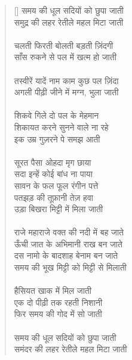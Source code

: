 \begin{verse}[\versewidth]\texthindi{
समय की धूल सदियों को छुपा जाती \\
समुद्र की लहर रेतीले महल मिटा जाती \\
\\
चलती फिरती बोलती बड़ती ज़िंदगी\\
साँस रुकने से पल में खत्म हो जाती\\
\\
तस्वीरें यादें नाम काम कुछ पल ज़िंदा\\
अगली पीढ़ी जीने में मग्न, भुला जाती \\
\\
शिकवे गिले दो पल के मेहमान\\
शिकायत करने सुनने वाले ना रहे \\
इक उम्र गुज़रने पे समझ आती\\
\\
सूरत पैसा ओहदा मृग छाया\\
सदा इन्हें कोई बांध ना पाया\\
सावन के फल फूल रंगीन पत्ते \\
पतझड़ की तूफ़ानी तेज़ हवा \\
उड़ा बिखरा मिट्टी में मिला जाती\\
\\
राजे महाराजे वक्त की नदी में बह जाते    \\
 ऊँची जात के अभिमानी राख बन जाते \\
दस नामो के बादशाह बेनाम बन जाते \\
समय की भूख मिट्टी को मिट्टी से मिलाती \\
\\
हैसियत खाक में मिल जाती\\
एक दो पीढ़ी तक रहती निशानी \\
फिर समय की गोद में सो जाती\\
\\
समय की धूल सदियों को छुपा जाती \\
समंदर की लहर रेतीले महल मिटा जाती
}\end{verse}